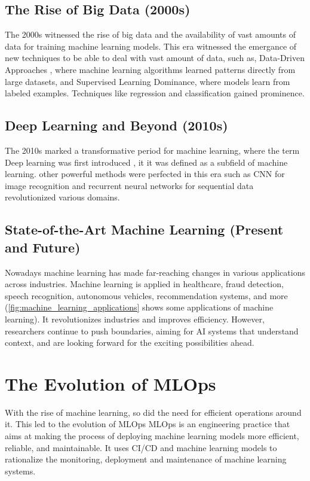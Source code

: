 \subsection{The Rise of Big Data (2000s)}
The 2000s witnessed the rise of big data and the availability of vast amounts of data for training machine learning models.
This era witnessed the emergance of new techniques to be able to deal with vast amount of data, such as,
Data-Driven Approaches \cite{Data-Driven-Approach, Data-Driven-Approach-2}, where machine learning algorithms learned patterns directly from large datasets, and Supervised Learning Dominance, where models learn from labeled examples.
Techniques like regression and classification gained prominence.

\subsection{Deep Learning and Beyond (2010s)}
The 2010s marked a transformative period for machine learning, where the term Deep learning was first introduced
, it it was defined as a subfield of machine learning. other powerful methods were perfected in this era such as \ac{CNN} for image recognition and recurrent neural networks for sequential data revolutionized various domains.

\subsection{State-of-the-Art Machine Learning (Present and Future)}
Nowadays machine learning has made far-reaching changes in various applications across industries.
Machine learning is applied in healthcare, fraud detection, speech recognition, autonomous vehicles, recommendation systems, and more (\autoref{fig:machine_learning_applications} shows some applications of machine learning).
It revolutionizes industries and improves efficiency. However, researchers continue to push boundaries, aiming for \ac{AI} systems that understand context, and are looking forward for the exciting possibilities ahead.


\section{The Evolution of MLOps}
With the rise of machine learning, so did the need for efficient operations around it. This led to the evolution of \ac{MLOps}
\ac{MLOps} is an engineering practice that aims at making the process of deploying machine learning models more efficient, reliable, and maintainable.
It uses \ac{CI/CD} and machine learning models to rationalize the monitoring, deployment and maintenance of machine learning systems.

